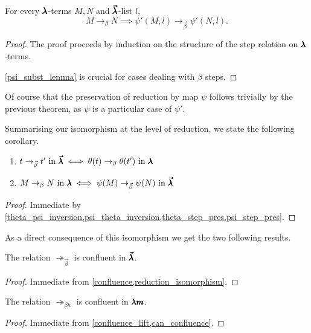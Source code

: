 \begin{theorem}
  \label{psi_step_pres}
  For every $\pmb{\lambda}$-terms $M, N$ and $\pmb{\vec \lambda}$-list $l$,
  \[ M \to_{\beta} N \implies \psi'(M, l) \to_{\vec \beta} \psi'(N, l). \]
\end{theorem}
\begin{proof}
  The proof proceeds by induction on the structure of the step relation on $\pmb{\lambda}$-terms.

  \cref{psi_subst_lemma} is crucial for cases dealing with $\beta$ steps.
\end{proof}

Of course that the preservation of reduction by map $\psi$ follows trivially by the previous theorem, as $\psi$ is a particular case of $\psi'$.

Summarising our isomorphism at the level of reduction, we state the following corollary.

\begin{corollary} \hfill
  \label{reduction_isomorphism}
  \begin{enumerate}
  \item $t \to_{\vec \beta} t' \text{ in } \pmb{\vec \lambda} \iff \theta(t) \to_{\beta} \theta(t') \text{ in } \pmb{\lambda}$
  \item $M \to_{\beta} N \text{ in } \pmb{\lambda} \iff \psi(M) \to_{\vec \beta} \psi(N) \text{ in } \pmb{\vec \lambda}$
  \end{enumerate}
\end{corollary}
\begin{proof}
  Immediate by \cref{theta_psi_inversion,psi_theta_inversion,theta_step_pres,psi_step_pres}.
\end{proof}

As a direct consequence of this isomorphism we get the two following results.

\begin{corollary}
  \label{can_confluence}
  The relation $\twoheadrightarrow_{\vec \beta}$ is confluent in $\pmb{\vec \lambda}$. 
\end{corollary}
\begin{proof}
  Immediate from \cref{confluence,reduction_isomorphism}.
\end{proof}

\begin{corollary}
  The relation $\twoheadrightarrow_{\beta h}$ is confluent in $\pmb{\lambda m}$. 
\end{corollary}
\begin{proof}
  Immediate from \cref{confluence_lift,can_confluence}.
\end{proof}

